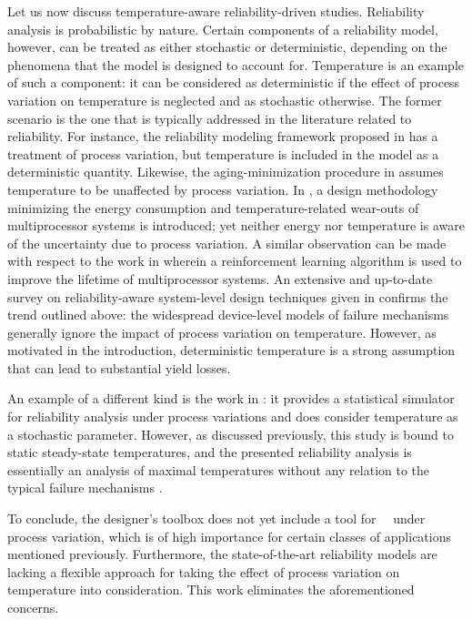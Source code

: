 Let us now discuss temperature-aware reliability-driven studies.
Reliability analysis is probabilistic by nature.
Certain components of a reliability model, however, can be treated as either stochastic or deterministic, depending on the phenomena that the model is designed to account for.
Temperature is an example of such a component: it can be considered as deterministic if the effect of process variation on temperature is neglected and as stochastic otherwise.
The former scenario is the one that is typically addressed in the literature related to reliability.
For instance, the reliability modeling framework proposed in \cite{xiang2010} has a treatment of process variation, but temperature is included in the model as a deterministic quantity.
Likewise, the aging-minimization procedure in \cite{ukhov2012} assumes temperature to be unaffected by process variation.
In \cite{das2014a}, a design methodology minimizing the energy consumption and temperature-related wear-outs of multiprocessor systems is introduced; yet neither energy nor temperature is aware of the uncertainty due to process variation.
A similar observation can be made with respect to the work in \cite{das2014c} wherein a reinforcement learning algorithm is used to improve the lifetime of multiprocessor systems.
An extensive and up-to-date survey on reliability-aware system-level design techniques given in \cite{das2014b} confirms the trend outlined above: the widespread device-level models of failure mechanisms generally ignore the impact of process variation on temperature.
However, as motivated in the introduction, deterministic temperature is a strong assumption that can lead to substantial yield losses.

An example of a different kind is the work in \cite{lee2013}: it provides a statistical simulator for reliability analysis under process variations and does consider temperature as a stochastic parameter.
However, as discussed previously, this study is bound to static steady-state temperatures, and the presented reliability analysis is essentially an analysis of maximal temperatures without any relation to the typical failure mechanisms \cite{jedec}.

To conclude, the designer's toolbox does not yet include a tool for \DSS\ \ta\ under process variation, which is of high importance for certain classes of applications mentioned previously.
Furthermore, the state-of-the-art reliability models are lacking a flexible approach for taking the effect of process variation on temperature into consideration.
This work eliminates the aforementioned concerns.
